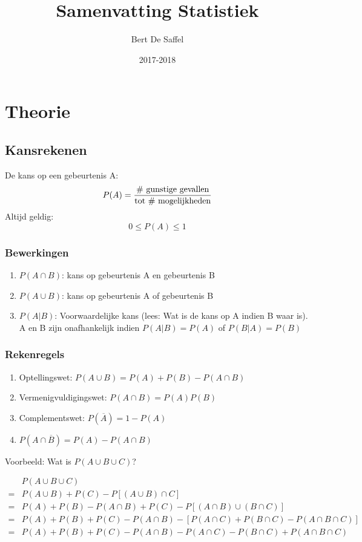 \documentclass[12pt]{report}
\title{Samenvatting Statistiek}
\author{Bert De Saffel}
\date{2017-2018}
\newcommand{\example}[2]{
      \hrulefill
      
      Voorbeeld: #1
      
      #2
      
      \hrulefill
  }
\begin{document}
\maketitle
\tableofcontents

\part{Theorie}
\chapter{Kansrekenen}
De kans op een gebeurtenis A:
$$P(A) = \frac{\hbox{\# gunstige gevallen}}{\hbox{tot \# mogelijkheden}}$$
Altijd geldig: 
$$0 \leq P(A) \leq 1$$
\section{Bewerkingen}
\begin{enumerate}
	\item $P(A \cap B)$: kans op gebeurtenis A en gebeurtenis B
	\item $P(A \cup B)$: kans op gebeurtenis A of gebeurtenis B
	\item $P(A|B)$: Voorwaardelijke kans (lees: Wat is de kans op A indien B waar is). A en B zijn onafhankelijk indien $P(A|B) = P(A)$ of $P(B|A) = P(B)$
\end{enumerate}
\section{Rekenregels}
\begin{enumerate}
	\item Optellingswet: $P(A \cup B) = P(A) + P(B) - P(A \cap B)$
	\item Vermenigvuldigingswet: $P(A \cap B) = P(A)P(B)$
	\item Complementswet: $P(\overline{A}) = 1 - P(A)$
	\item $P(A \cap \overline{B}) = P(A) - P(A \cap B)$
\end{enumerate}
\example{Wat is $P(A\cup B\cup C)$?}
{
	\begin{equation*}
		\begin{split}
			& P(A\cup B\cup C)\\
			= & P(A\cup B) + P(C) - P[(A \cup B) \cap C]\\
			= & P(A) + P(B) - P(A\cap B) + P(C) - P[(A \cap B) \cup (B \cap C)]\\
			= & P(A) + P(B) + P(C) - P(A \cap B) - [P(A \cap C) + P(B \cap C) - P(A \cap B \cap C)]\\
			= & P(A) + P(B) + P(C) - P(A \cap B) - P(A \cap C) - P(B \cap C) + P(A \cap B \cap C)
		\end{split}
	\end{equation*}
}
\end{document}
